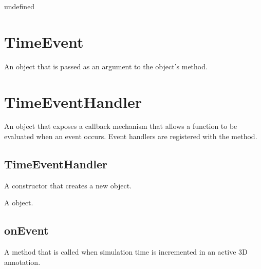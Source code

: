 \documentclass[letterpaper,12pt,english,openany,oneside]{sphinxmanual}
\begin{document}
undefined


\section{TimeEvent}
\label{\detokenize{JS_3D_API:timeevent}}
An object that is passed as an argument to the  object’s  method.

\label{\detokenize{JS_3D_API:properties-32}}


\section{TimeEventHandler}
\label{\detokenize{JS_3D_API:timeeventhandler}}
An object that exposes a callback mechanism that allows a function to be evaluated when an event occurs. Event handlers are registered with the   method.


\subsection{TimeEventHandler}
\label{\detokenize{JS_3D_API:timeeventhandler-1}}\label{\detokenize{JS_3D_API:id40}}
A constructor that creates a new  object.

\label{\detokenize{JS_3D_API:syntax-123}}

\begin{sphinxVerbatim}[commandchars=\\\{\}]
 
\end{sphinxVerbatim}
\label{\detokenize{JS_3D_API:returns-124}}

A  object.


\subsection{onEvent}
\label{\detokenize{JS_3D_API:onevent-9}}\label{\detokenize{JS_3D_API:id41}}
A method that is called when simulation time is incremented in an active 3D annotation.

\label{\detokenize{JS_3D_API:syntax-124}}
\end{document}
